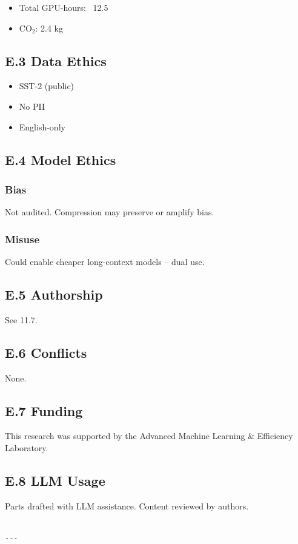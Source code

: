 \begin{itemize}
\item Total GPU-hours: ~12.5
\item CO$_2$: 2.4 kg

\end{itemize}
\subsection{E.3 Data Ethics}

\begin{itemize}
\item SST-2 (public)
\item No PII
\item English-only

\end{itemize}
\subsection{E.4 Model Ethics}

\subsubsection{Bias}
Not audited. Compression may preserve or amplify bias.

\subsubsection{Misuse}
Could enable cheaper long-context models -- dual use.

\subsection{E.5 Authorship}

See  11.7.

\subsection{E.6 Conflicts}

None.

\subsection{E.7 Funding}

This research was supported by the Advanced Machine Learning \& Efficiency Laboratory.

\subsection{E.8 LLM Usage}

Parts drafted with LLM assistance. Content reviewed by authors.
\begin{lstlisting}

---
\end{lstlisting}